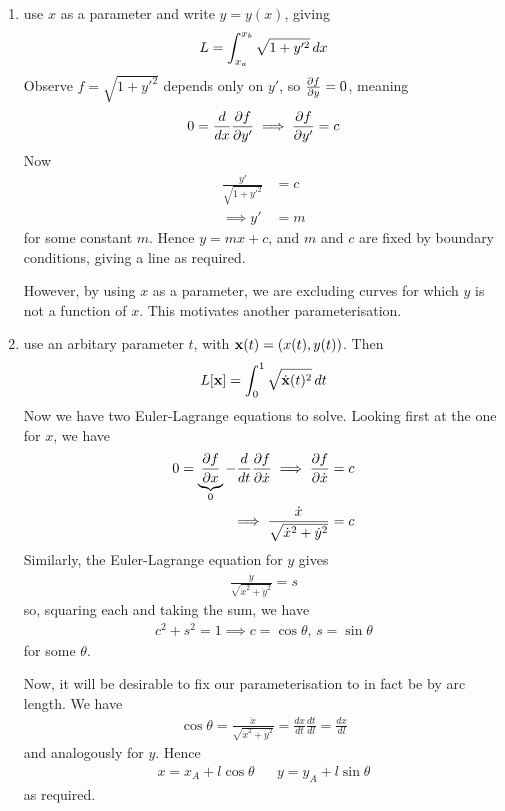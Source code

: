 \documentclass{../../template/note}
\begin{document}
    \begin{enumerate}[label=\protect\circled{\arabic*}]
        \item use $x$ as a parameter and write $y = y(x)$, giving
        \begin{align*}
            L = \int_{x_a}^{x_b} \sqrt{1+y'^2} \,d{x}
        \end{align*}
        Observe $f = \sqrt{1+y'^2}$ depends only on $y'$, so $\pd{f}{y} = 0$, meaning
        \begin{align*}
            0 = \frac{d}{dx} \pd{f}{y'} \implies \pd{f}{y'} = c
        \end{align*}
        Now
        \begin{align*}
            \frac{y'}{\sqrt{1+y'^2}} &= c \\
            \implies y' &= m
        \end{align*}
        for some constant $m$. Hence $y = mx + c$, and $m$ and $c$ are fixed by boundary conditions, giving a line as required.

        However, by using $x$ as a parameter, we are excluding curves for which $y$ is not a function of $x$. This motivates another parameterisation.

        \item use an arbitary parameter $t$, with $\V x(t) = (x(t), y(t))$. Then
        \begin{align*}
            L[\V x] = \int_0^1 \sqrt{\dot{\V x}(t)^2} \D t
        \end{align*}
        Now we have two Euler-Lagrange equations to solve. Looking first at the one for $x$, we have
        \begin{align*}
            0 = \underbrace{\pd{f}{x}}_0 - \frac{d}{dt} \pd{f}{\dot x} \implies \pd{f}{\dot x} &= c \\
            \implies \frac{\dot x}{\sqrt{\dot x^2 + \dot y^2}} &= c
        \end{align*}
        Similarly, the Euler-Lagrange equation for $y$ gives
        \begin{align*}
            \frac{\dot y}{\sqrt{\dot x^2 + \dot y^2}} = s
        \end{align*}
        so, squaring each and taking the sum, we have
        \begin{align*}
            c^2 + s^2 = 1 \implies c = \cos \theta, \, s = \sin \theta
        \end{align*}
        for some $\theta$.

        Now, it will be desirable to fix our parameterisation to in fact be by arc length. We have
        \begin{align*}
            \cos \theta = \frac{\dot x}{\sqrt{\dot x^2 + \dot y^2}} = \frac{dx}{dt} \frac{dt}{dl} = \frac{dx}{dl}
        \end{align*}
        and analogously for $y$. Hence
        \begin{align*}
            x = x_A + l \cos \theta && y = y_A + l \sin \theta
        \end{align*}
        as required.   
        

\end{enumerate}
\end{document}

